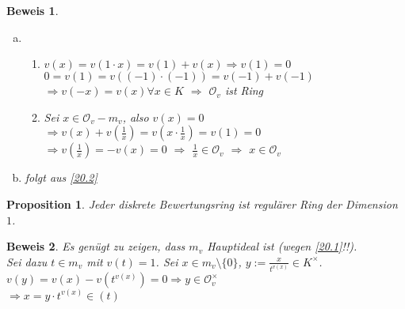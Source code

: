 \documentclass[a4paper,12pt]{report}
\theoremstyle{break}
\newtheorem{Prop}[Def]{Proposition}
\theoremstyle{nonumberbreak}
\newtheorem{Bew}{Beweis}
\theoremstyle{nonumberplain}
\newcommand{\calO}{\mathcal{O}}
\begin{document}
\begin{Bew}\begin{enumerate}[a)]
\item[b)]
	\begin{enumerate}[$\calO_v$ lokal:]
	\item[$\calO_v$ Ring:]$v(x)=v(1\cdot x)=v(1)+v(x) \Rightarrow v(1)=0$\\
		$0=v(1)=v((-1)\cdot(-1))=v(-1)+v(-1)$\\
		$\Rightarrow v(-x)=v(x)\forall x\in K$ $\Rightarrow$ $\calO_v$ ist Ring
	\item[$\calO_v$ lokal:]Sei $x\in \calO_v-m_v$, also $v(x)=0$\\
		$\Rightarrow v(x)+v(\frac{1}{x})=v(x\cdot \frac{1}{x})=v(1)=0$\\
		$\Rightarrow v(\frac{1}{x})=-v(x)=0$ $\Rightarrow$ $\frac{1}{x}\in\calO_v$ $\Rightarrow$ $x\in\calO_v$
	\end{enumerate}
\item[d)]
	folgt aus \ref{20.2}
\end{enumerate}\end{Bew}

\begin{Prop}
Jeder diskrete Bewertungsring ist regul\"arer Ring der Dimension $1$.
\end{Prop}

\begin{Bew}
Es gen\"ugt zu zeigen, dass $m_v$ Hauptideal ist (wegen \ref{20.1}!!).\\
Sei dazu $t\in m_v$ mit $v(t)=1$. Sei $x\in m_v\setminus\{0\}$, $y:=\frac{x}{t^{v(x)}}\in K^\times$.\\
$v(y)=v(x)-v(t^{v(x)})=0\Rightarrow y\in \calO_v^\times$\\
$\Rightarrow x=y\cdot t^{v(x)}\in(t)$
\end{Bew}
\end{document}
